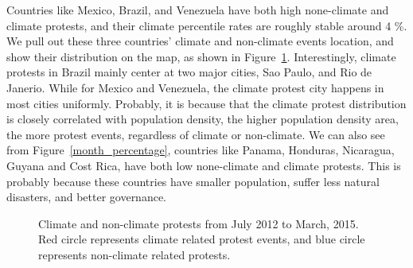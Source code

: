\documentclass[9pt,twocolumn,twoside]{pnas-new}
\begin{document}
Countries like Mexico, Brazil, and Venezuela have both high none-climate and climate protests, and their climate percentile rates are roughly stable around 4 \%. 
We pull out these three countries' climate and non-climate events location, and show their distribution on the map, as shown in Figure~\ref{climate-map}. Interestingly, climate protests in Brazil mainly center at two major cities, Sao Paulo, and Rio de Janerio. While for Mexico and Venezuela, the climate protest city happens in most cities uniformly. Probably, it is because that the climate protest distribution is closely correlated with population density, the higher population density area, the more protest events, regardless of climate or non-climate. We can also see from Figure~\ref{month_percentage}, countries like Panama, Honduras, Nicaragua, Guyana and Cost Rica, have both low none-climate and climate protests. This is probably because these countries have smaller population, suffer less natural disasters, and better governance.



\begin{figure}[ht]
	\centering
	\caption{Climate and non-climate protests from July 2012 to March, 2015. Red circle represents climate related protest events, and blue circle represents non-climate related protests. }
\label{climate-map}
\end{figure}
\end{document}
